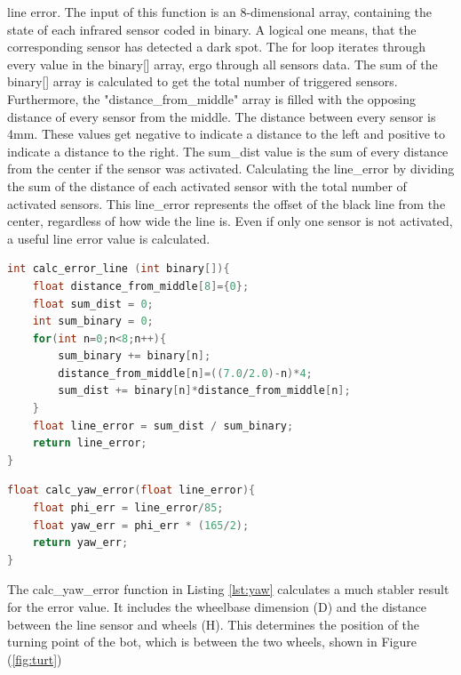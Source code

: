 \documentclass[english]{article}
\begin{document}
line error. The input of this function is an 8-dimensional array, containing
the state of each infrared sensor coded in binary. A logical one means, that
the corresponding sensor has detected a dark spot. The for loop iterates
through every value in the binary[] array, ergo through all sensors data. The sum of the binary[] array is calculated to get the total number of triggered 
sensors. Furthermore,  the "distance\_from\_middle" array is filled with the 
 opposing distance of every sensor from the middle. The distance between every
 sensor is 4mm. These values get negative to indicate a distance to the left and 
positive to indicate a distance to the right. The sum\_dist value is the sum of
every distance from the center if the sensor was activated. Calculating the 
line\_error by dividing the sum of the distance of each activated sensor with
 the total number of activated sensors. This line\_error represents the 
 offset of the black line from the center, regardless of how wide the line is.
  Even if only one sensor is not activated, a useful line error value is calculated. 
\begin{lstlisting}[language=C, caption={Function to calculate the line error based on a binary array }, label={lst:calcer} ]
int calc_error_line (int binary[]){
    float distance_from_middle[8]={0};
    float sum_dist = 0;
    int sum_binary = 0;
    for(int n=0;n<8;n++){
        sum_binary += binary[n];
        distance_from_middle[n]=((7.0/2.0)-n)*4;
        sum_dist += binary[n]*distance_from_middle[n];
    }
    float line_error = sum_dist / sum_binary;
    return line_error;
}
\end{lstlisting}
\newpage
\begin{lstlisting}[language=C, caption={Conversion from line error to yaw error }, label={lst:yaw} ]
float calc_yaw_error(float line_error){
    float phi_err = line_error/85;
    float yaw_err = phi_err * (165/2);
    return yaw_err;
}
\end{lstlisting}
The calc\_yaw\_error function in Listing \ref{lst:yaw} calculates a much stabler result
 for the error value. It includes the wheelbase dimension (D) and the 
 distance between the line sensor and wheels (H). This determines the 
 position of the turning point of the bot, which is between the two wheels, 
 shown in Figure (\ref{fig:turt}) 
\end{document}
